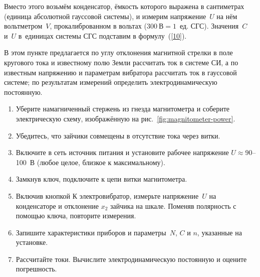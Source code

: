 Вместо этого возьмём конденсатор, ёмкость которого выражена в сантиметрах (единица абсолютной гауссовой системы), и
измерим напряжение~$U$ на нём вольтметром~$V$, прокалиброванном в вольтах ($300~В = 1$~ед. СГС). Значения~$C$ и~$U$
в~единицах системы СГС подставим в формулу~(\eqref{10}).

\begin{lab:task}

    В этом пункте предлагается по углу отклонения магнитной стрелки в поле кругового тока и известному полю Земли рассчитать
    ток в системе СИ, а по известным напряжению и параметрам вибратора рассчитать ток в гауссовой системе; по результатам
    измерений определить электродинамическую постоянную.

    \begin{enumerate}
        \item Уберите намагниченный стержень из гнезда магнитометра и соберите электрическую схему, изображённую на рис.~\ref{fig:magnitometer-power}.

        \item Убедитесь, что зайчики совмещены в отсутствие тока через витки.

        \item Включите в сеть источник питания и установите рабочее напряжение $U\approx 90$--100~В (любое целое, близкое к
        максимальному).

        \item Замкнув ключ, подключите к цепи витки магнитометра.

        \item Включив кнопкой К электровибратор, измерьте напряжение~$U$ на конденсаторе и отклонение $x_2$ зайчика на шкале.
        Поменяв полярность с помощью ключа, повторите измерения.

        \item Запишите характеристики приборов и параметры~$N$, $C$ и $n$, указанные на установке.

        \item Рассчитайте токи. Вычислите электродинамическую постоянную и оцените погрешность.
    \end{enumerate}


\end{lab:task}


